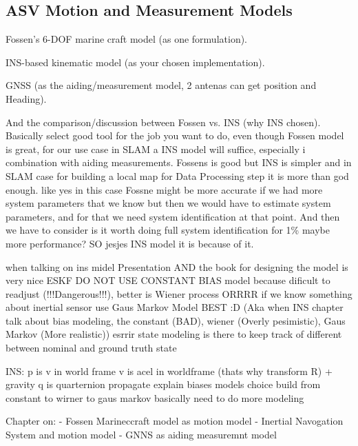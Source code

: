 \subsection{ASV Motion and Measurement Models}
Fossen’s 6-DOF marine craft model (as one formulation).

INS-based kinematic model (as your chosen implementation).

GNSS (as the aiding/measurement model, 2 antenas can get position and Heading).

And the comparison/discussion between Fossen vs. INS (why INS chosen).
Basically select good tool for the job you want to do, even though Fossen model is great, for our use case in SLAM a INS model will suffice, especially i combination with aiding measurements. Fossens is good but INS is simpler and in SLAM case for building a local map for Data Processing step it is more than god enough. like yes in this case Fossne might be more accurate if we had more system parameters that we know but then we would have to estimate system parameters, and for that we need system identification at that point. And then we have to consider is it worth doing full system identification for 1\% maybe more performance? SO jesjes INS model it is because of it.

when talking on ins midel Presentation AND the book for designing the model is very nice
ESKF DO NOT USE CONSTANT BIAS model because dificult to readjust (!!!Dangerous!!!), better is Wiener process ORRRR if we know something about inertial sensor use Gaus Markov Model BEST :D (Aka when INS chapter talk about bias modeling, the constant (BAD), wiener (Overly pesimistic), Gaus Markov (More realistic))
esrrir state modeling is there to keep track of different between nominal and ground truth state

INS:
p is v in world frame
v is acel in worldframe (thats why transform R) + gravity
q is quarternion propagate explain
biases models choice build from constant to wirner to gaus markov
basically need to do more modeling 


Chapter on:
- Fossen Marineccraft model as motion model
- Inertial Navogation System and motion model
- GNNS as aiding measuremnt model